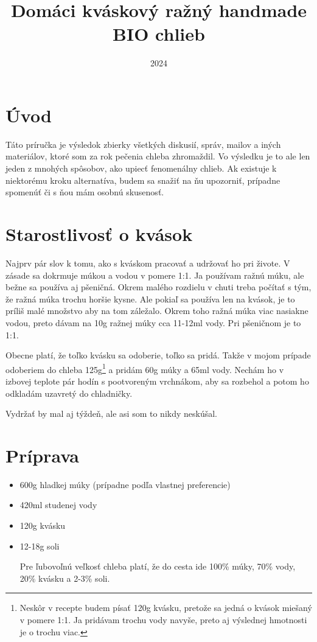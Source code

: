 \documentclass[a4paper,12pt]{article}
\title{Domáci kváskový ražný handmade BIO chlieb}
\date{2024}
\begin{document}
\maketitle


\section{Úvod}
Táto príručka je výsledok zbierky všetkých diskusií, správ, mailov a iných materiálov, ktoré som za rok pečenia chleba zhromaždil. Vo výsledku je to ale len jeden z mnohých spôsobov, ako upiecť fenomenálny chlieb. Ak existuje k niektorému kroku alternatíva, budem sa snažiť na ňu upozorniť, prípadne spomenúť či s ňou mám osobnú skusenosť.

\section{Starostlivosť o kvások}
Najprv pár slov k tomu, ako s kváskom pracovať a udržovať ho pri živote. V zásade sa dokrmuje múkou a vodou v pomere 1:1. Ja používam ražnú múku, ale bežne sa používa aj pšeničná. Okrem malého rozdielu v chuti treba počítať s tým, že ražná múka trochu horšie kysne. Ale pokiaľ sa používa len na kvások, je to príliš malé množstvo aby na tom záležalo. Okrem toho ražná múka viac nasiakne vodou, preto dávam na 10g ražnej múky cca 11-12ml vody. Pri pšeničnom je to 1:1.

Obecne platí, že toľko kvásku sa odoberie, toľko sa pridá. Takže v mojom prípade odoberiem do chleba 125g\footnote{Neskôr v recepte budem písať 120g kvásku, pretože sa jedná o kvások miešaný v pomere 1:1. Ja pridávam trochu vody navyše, preto aj výslednej hmotnosti je o trochu viac.} a pridám 60g múky a 65ml vody. Nechám ho v izbovej teplote pár hodín s pootvoreným vrchnákom, aby sa rozbehol a potom ho odkladám uzavretý do chladničky.

Vydržať by mal aj týždeň, ale asi som to nikdy neskúšal.

\section{Príprava}
\begin{tcolorbox}[colframe=blue!50!black, colback=blue!5!white, title=Ingrediencie]
    \begin{itemize}
        \item 600g hladkej múky (prípadne podľa vlastnej preferencie)
        \item 420ml studenej vody
        \item 120g kvásku
        \item 12-18g soli

        Pre ľubovoľnú veľkosť chleba platí, že do cesta ide 100\% múky, 70\% vody, 20\% kvásku a  2-3\% soli.
    \end{itemize}
\end{tcolorbox}
\end{document}
